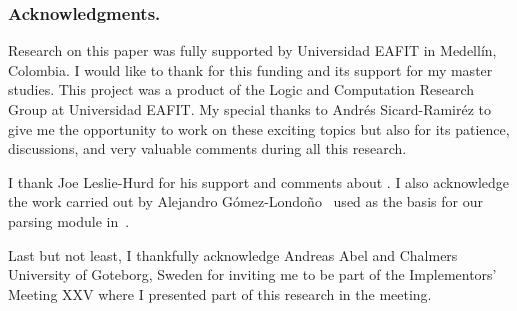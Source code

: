\documentclass[../main.tex]{subfiles}
\begin{document}

\subsubsection*{Acknowledgments.}

Research on this paper was fully supported by Universidad EAFIT in Medellín,
Colombia. I would like to thank for this funding and its support for
my master studies.
This project was a product of the Logic and Computation
Research Group at Universidad EAFIT.
My special thanks to Andrés Sicard-Ramiréz to give me the opportunity
to work on these exciting topics but also for its patience, discussions,
and very valuable comments during all this research.

I thank Joe Leslie-Hurd for his support and comments about \Metis.
I also acknowledge the work carried out by Alejandro
G\'omez-Londo\~no~\cite{Gomez-Londono2015} used as the basis
for our \TSTP parsing module in~\cite{Athena}.

Last but not least, I thankfully acknowledge
Andreas Abel and Chalmers University of Goteborg, Sweden for
inviting me to be part of the \Agda Implementors’ Meeting XXV
where I presented part of this research in the meeting.
\end{document}
